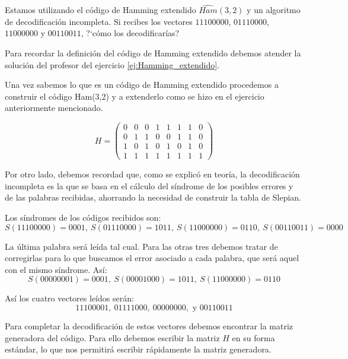 \begin{problem}[7]
Estamos utilizando el código de Hamming extendido
$\widehat{Ham} (3,2)$  y un algoritmo de decodificación
incompleta. Si recibes los vectores $11100000$, $01110000$,
$11000000$ y $00110011$, ?`cómo los decodificarías?

\solution


Para recordar la definición del código de Hamming extendido debemos atender la solución del profesor del ejercicio \ref{ej:Hamming_extendido}.

Una vez sabemos lo que es un código de Hamming extendido procedemos a construir el código Ham(3,2) y a extenderlo como se hizo en el ejercicio anteriormente mencionado.

\[H = \left( \begin{array}{ccccccc|c}
0 & 0 & 0 & 1 & 1 & 1 & 1 & 0 \\
0 & 1 & 1 & 0 & 0 & 1 & 1 & 0 \\
1 & 0 & 1 & 0 & 1 & 0 & 1 & 0 \\
\hline
1 & 1 & 1 & 1 & 1 & 1 & 1 & 1
\end{array}\right)\]

Por otro lado, debemos recordad que, como se explicó en teoría, la decodificación incompleta es la que se basa en el cálculo del síndrome de los posibles errores y de las palabras recibidas, ahorrando la necesidad de construir la tabla de Slepian.

Los síndromes de los códigos recibidos son:
\[S(11100000)= 0001, \ S(01110000)= 1011, \ S(11000000)= 0110, \ S(00110011)= 0000 \]

La última palabra será leída tal cual. Para las otras tres debemos tratar de corregirlas para lo que buscamos el error asociado a cada palabra, que será aquel con el mismo síndrome. Así:
\[S(00000001)=0001, \ S(00001000) = 1011, \ S(11000000)=0110\]

Así los cuatro vectores leídos serán:
\[11100001, \ 01111000, \ 00000000, \text{ y } 00110011\]

Para completar la decodificación de estos vectores debemos encontrar la matriz generadora del código. Para ello debemos escribir la matriz $H$ en su forma estándar, lo que nos permitirá escribir rápidamente la matriz generadora.

\end{problem}



